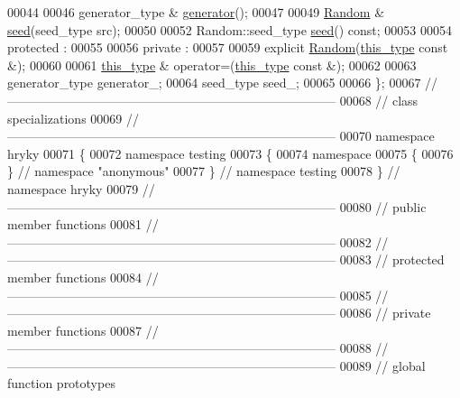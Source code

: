 \begin{DoxyCode}
00044 
00046     generator\_type & \hyperlink{classhryky_1_1testing_1_1_random_ad27c26b20876bd0275fe320b93c61515}{generator}();
00047 
00049     \hyperlink{classhryky_1_1testing_1_1_random}{Random} & \hyperlink{classhryky_1_1testing_1_1_random_a958cec1b0034ea77629b6e5e9c8ecddc}{seed}(seed\_type src);
00050 
00052     Random::seed\_type \hyperlink{classhryky_1_1testing_1_1_random_a958cec1b0034ea77629b6e5e9c8ecddc}{seed}() \textcolor{keyword}{const};
00053 
00054 \textcolor{keyword}{protected} :
00055 
00056 \textcolor{keyword}{private} :
00057 
00059     \textcolor{keyword}{explicit} \hyperlink{classhryky_1_1testing_1_1_random_aca50cb32f01d8a1adadd5b7aa958ed46}{Random}(\hyperlink{classhryky_1_1testing_1_1_random}{this_type} \textcolor{keyword}{const} &);
00060 
00061     \hyperlink{classhryky_1_1testing_1_1_random}{this_type} & operator=(\hyperlink{classhryky_1_1testing_1_1_random}{this_type} \textcolor{keyword}{const} &);
00062 
00063     generator\_type  generator\_;
00064     seed\_type       seed\_;
00065 
00066 \};
00067 \textcolor{comment}{//
      ------------------------------------------------------------------------------}
00068 \textcolor{comment}{// class specializations}
00069 \textcolor{comment}{//
      ------------------------------------------------------------------------------}
00070 \textcolor{keyword}{namespace }hryky
00071 \{
00072 \textcolor{keyword}{namespace }testing
00073 \{
00074 \textcolor{keyword}{namespace}
00075 \{
00076 \} \textcolor{comment}{// namespace "anonymous"}
00077 \} \textcolor{comment}{// namespace testing}
00078 \} \textcolor{comment}{// namespace hryky}
00079 \textcolor{comment}{//
      ------------------------------------------------------------------------------}
00080 \textcolor{comment}{// public member functions}
00081 \textcolor{comment}{//
      ------------------------------------------------------------------------------}
00082 \textcolor{comment}{//
      ------------------------------------------------------------------------------}
00083 \textcolor{comment}{// protected member functions}
00084 \textcolor{comment}{//
      ------------------------------------------------------------------------------}
00085 \textcolor{comment}{//
      ------------------------------------------------------------------------------}
00086 \textcolor{comment}{// private member functions}
00087 \textcolor{comment}{//
      ------------------------------------------------------------------------------}
00088 \textcolor{comment}{//
      ------------------------------------------------------------------------------}
00089 \textcolor{comment}{// global function prototypes}

\end{DoxyCode}
